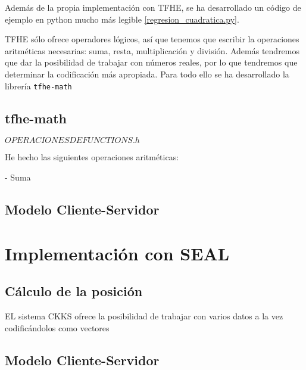 Además de la propia implementación con TFHE, se ha desarrollado un código de ejemplo en python mucho más legible \ref{regresion_cuadratica.py}.

TFHE sólo ofrece operadores lógicos, así que tenemos que escribir la operaciones aritméticas necesarias: suma, resta, multiplicación y división. Además tendremos que dar la posibilidad de trabajar con números reales, por lo que tendremos que determinar la codificación más apropiada. Para todo ello se ha desarrollado la librería \texttt{tfhe-math}

\subsection{tfhe-math}

$ OPERACIONES DE FUNCTIONS.h $

He hecho las siguientes operaciones aritméticas:

- Suma

\subsection{Modelo Cliente-Servidor}


\section{Implementación con SEAL}

\subsection{Cálculo de la posición}

EL sistema CKKS ofrece la posibilidad de trabajar con varios datos a la vez codificándolos como vectores

\subsection{Modelo Cliente-Servidor}
